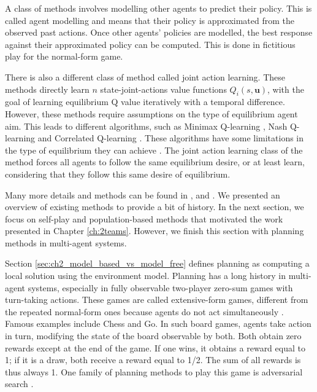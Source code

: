 A class of methods involves modelling other agents to predict their policy.
This is called agent modelling and means that their policy is approximated from the observed past actions.
Once other agents' policies are modelled, the best response against their approximated policy can be computed.
This is done in fictitious play \citep{brown1951iterative} for the normal-form game.

There is also a different class of method called joint action learning.
These methods directly learn $n$ state-joint-actions value functions $Q_i(s, \mathbf{u})$, with the goal of learning equilibrium Q value iteratively with a temporal difference.
However, these methods require assumptions on the type of equilibrium agent aim.
This leads to different algorithms, such as Minimax Q-learning \citep{MarkovGames}, Nash Q-learning \citep{hu2003nash} and Correlated Q-learning \citep{greenwald2003correlated}.
These algorithms have some limitations in the type of equilibrium they can achieve \citep{marl-book}.
The joint action learning class of the method forces all agents to follow the same equilibrium desire, or at least learn, considering that they follow this same desire of equilibrium.

Many more details and methods can be found in \citep{marl-book}, \citep{Nowe2012GTMARL} and \citep{russel2010}.
We presented an overview of existing methods to provide a bit of history.
In the next section, we focus on self-play and population-based methods that motivated the work presented in Chapter \ref{ch:2teams}.
However, we finish this section with planning methods in multi-agent systems.

Section \ref{sec:ch2_model_based_vs_model_free} defines planning as computing a local solution using the environment model.
Planning has a long history in multi-agent systems, especially in fully observable two-player zero-sum games with turn-taking actions.
These games are called extensive-form games, different from the repeated normal-form ones because agents do not act simultaneously \citep{Nowe2012GTMARL}.
Famous examples include Chess and Go.
In such board games, agents take action in turn, modifying the state of the board observable by both.
Both obtain zero rewards except at the end of the game.
If one wins, it obtains a reward equal to 1; if it is a draw, both receive a reward equal to 1/2.
The sum of all rewards is thus always 1.
One family of planning methods to play this game is adversarial search \citep{russel2010}.

